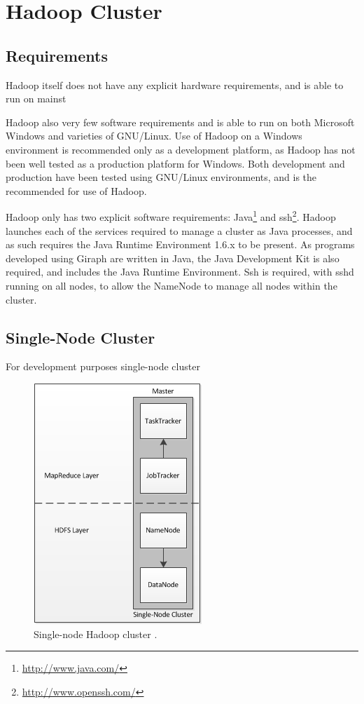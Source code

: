 \section{Hadoop Cluster}
\subsection{Requirements}
Hadoop itself does not have any explicit hardware requirements, and is able to run on mainst

Hadoop also very few software requirements and is able to run on both Microsoft Windows and varieties of GNU/Linux. Use of Hadoop on a Windows environment is recommended only as a development platform, as Hadoop has not been well tested as a production platform for Windows. Both development and production have been tested using GNU/Linux environments, and is the recommended for use of Hadoop.

Hadoop only has two explicit software requirements: Java\footnote{\url{http://www.java.com/}} and ssh\footnote{\url{http://www.openssh.com/}}. Hadoop launches each of the services required to manage a cluster as Java processes, and as such requires the Java Runtime Environment 1.6.x to be present. As programs developed using Giraph are written in Java, the Java Development Kit is also required, and includes the Java Runtime Environment. Ssh is required, with sshd running on all nodes, to allow the NameNode to manage all nodes within the cluster. 

\subsection{Single-Node Cluster}
For development purposes single-node cluster \cite{nollsingle}

\begin{figure}[htbp]
  \centering
    \includegraphics{./img/singlenode}
  \caption{Single-node Hadoop cluster \cite{nollsingle}.}
  \label{fig:singlenode}
\end{figure}

